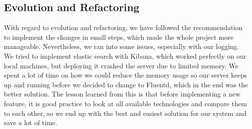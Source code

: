 \subsection{Evolution and Refactoring}
With regard to evolution and refactoring, we have followed the recommendation to implement the changes in small steps, which made the whole project more manageable. 
Nevertheless, we ran into some issues, especially with our logging. We tried to implement elastic search with Kibana, which worked perfectly on our local machines, 
but deploying it crashed the server due to limited memory. We spent a lot of time on how we could reduce the memory usage so our server keeps up and running 
before we decided to change to Fluentd, which in the end was the better solution. The lesson learned from this is that before implementing a new feature, 
it is good practice to look at all available technologies and compare them to each other, so we end up with the best and easiest solution for our system and save a lot of time. 